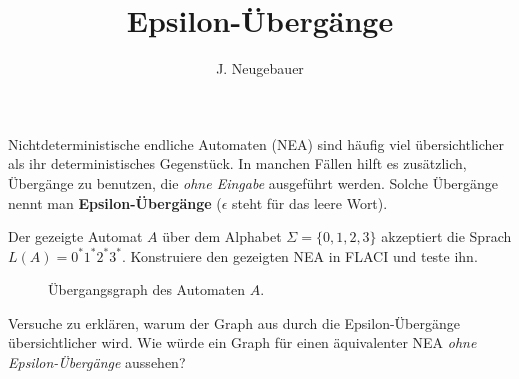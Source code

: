 \documentclass[10pt, a4paper]{scrartcl}
\author{J. Neugebauer}
\title{Epsilon-Übergänge}
\date{\Heute}
\begin{document}
\ReiheTitel

Nichtdeterministische endliche Automaten (NEA) sind häufig viel übersichtlicher als ihr deterministisches Gegenstück. In manchen Fällen hilft es zusätzlich, Übergänge zu benutzen, die \emph{ohne Eingabe} ausgeführt werden. Solche Übergänge nennt man \textbf{Epsilon-Übergänge} ($\epsilon$ steht für das leere Wort).

\begin{aufgabe}
	Der gezeigte Automat $A$ über dem Alphabet $\Sigma = \{0,1,2,3\}$ akzeptiert die Sprach $L(A) = 0^\ast1^\ast2^\ast3^\ast$. Konstruiere den gezeigten NEA in FLACI und teste ihn.
	
	\begin{figure}[h]
	    \centering
	    \begin{transitiongraph}[fa]
	    \end{transitiongraph}
	    \caption{Übergangsgraph des Automaten $A$.}
	    \label{abb:grah_1}
	\end{figure}
\end{aufgabe}

\begin{aufgabe}
	Versuche zu erklären, warum der Graph aus  durch die Epsilon-Übergänge übersichtlicher wird. Wie würde ein Graph für einen äquivalenter NEA \emph{ohne Epsilon-Übergänge} aussehen?
	
\end{aufgabe}
\end{document}

